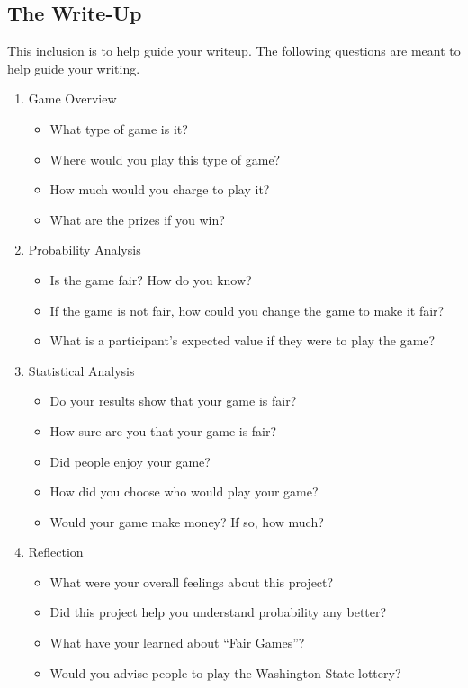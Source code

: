 \documentclass[11pt]{article}
\begin{document}
\subsection*{The Write-Up}
This inclusion is to help guide your writeup.  The following questions are meant to help guide your writing.
\begin{enumerate}
\item Game Overview
\begin{itemize}
\item What type of game is it?
\item Where would you play this type of game?
\item How much would you charge to play it?
\item What are the prizes if you win?
\end{itemize}
\item Probability Analysis
\begin{itemize}
\item Is the game fair?  How do you know?
\item If the game is not fair, how could you change the game to make it fair?
\item What is a participant's expected value if they were to play the game?
\end{itemize}
\item Statistical Analysis
\begin{itemize}
\item Do your results show that your game is fair?
\item How sure are you that your game is fair?
\item Did people enjoy your game?
\item How did you choose who would play your game?
\item Would your game make money?  If so, how much?
\end{itemize}
\item Reflection
\begin{itemize}
\item What were your overall feelings about this project?
\item Did this project help you understand probability any better?
\item What have your learned about ``Fair Games''?
\item Would you advise people to play the Washington State lottery?
\end{itemize}
\end{enumerate}
\end{document}
